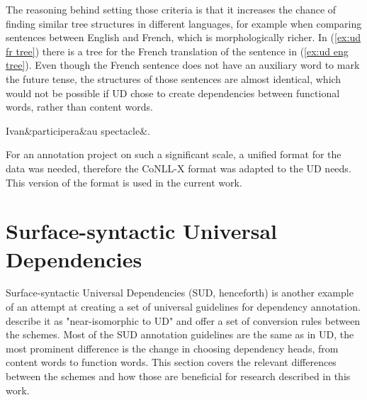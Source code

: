 The reasoning behind setting those criteria is that it increases the chance of finding similar tree structures in different languages, for example when comparing sentences between English and French, which is morphologically richer. In (\ref{ex:ud fr tree}) there is a tree for the French translation of the sentence in (\ref{ex:ud eng tree}). Even though the French sentence does not have an auxiliary word to mark the future tense, the structures of those sentences are almost identical, which would not be possible if UD chose to create dependencies between functional words, rather than content words.

\begin{exe}
    \ex
    \label{ex:ud fr tree}
    \begin{dependency}[theme = simple, baseline=-\the\dimexpr\fontdimen22\textfont2\relax]
        \begin{deptext}
            Ivan\&participera\&au spectacle\&.\\
        \end{deptext}
    \end{dependency}
\end{exe}

For an annotation project on such a significant scale, a unified format for the data was needed, therefore the CoNLL-X format was adapted to the UD needs. This version of the format is used in the current work. 

\section{Surface-syntactic Universal Dependencies}\label{sec:sud}
Surface-syntactic Universal Dependencies (SUD, henceforth) is another example of an attempt at creating a set of universal guidelines for dependency annotation. \cite{gerdes-etal-2018-sud} describe it as "near-isomorphic to UD" and offer a set of conversion rules between the schemes. Most of the SUD annotation guidelines are the same as in UD, the most prominent difference is the change in choosing dependency heads, from content words to function words. This section covers the relevant differences between the schemes and how those are beneficial for research described in this work.

